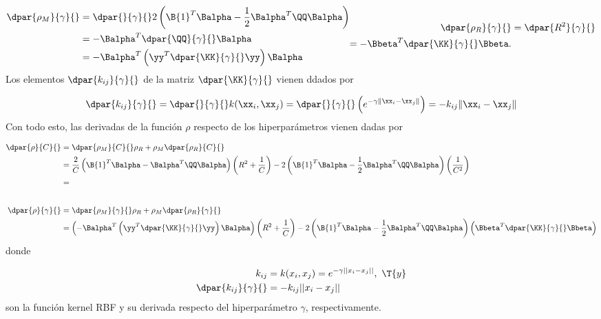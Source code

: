 \begin{align}
  \begin{aligned}
    \dpar{\rho_M}{\gamma}{}
    &= \dpar{}{\gamma}{} 2\left(  \B{1}^T\Balpha-\frac{1}{2}\Balpha^T\QQ\Balpha \right) \\
    &= - \Balpha^T \dpar{\QQ}{\gamma}{}\Balpha \\
    & = - \Balpha^T \left(\yy^T \dpar{\KK}{\gamma}{}\yy\right) \Balpha
  \end{aligned}
  \begin{aligned}
    \dpar{\rho_R}{\gamma}{} &= \dpar{R^2}{\gamma}{} \\
    = - \Bbeta^T \dpar{\KK}{\gamma}{} \Bbeta. %
  \end{aligned}
\end{align}
Los elementos $\dpar{k_{ij}}{\gamma}{}$ de la matriz $\dpar{\KK}{\gamma}{}$
vienen ddados por

\begin{align}
  \dpar{k_{ij}}{\gamma}{}
  = \dpar{}{\gamma}{}k(\xx_i,\xx_j)
  = \dpar{}{\gamma}{} \left(e^{-\gamma\|\xx_i-\xx_j\|}\right)
  = -k_{ij}\|\xx_i-\xx_j\|
\end{align}
Con todo esto, las derivadas de la función $\rho$ respecto de los
hiperparámetros vienen dadas por

\begin{align*}
    \dpar{\rho}{C}{} &= \dpar{\rho_M}{C}{} \rho_R + \rho_M \dpar{\rho_R}{C}{} \\
    &= \frac{2}{C} \left(\B{1}^T\Balpha - \Balpha^T\QQ\Balpha\right) \left( R^2 + \frac{1}{C} \right)
    - 2\left(  \B{1}^T\Balpha-\frac{1}{2}\Balpha^T\QQ\Balpha \right)
    \left( \frac{1}{C^2} \right)\\
    &=
  \\[2em]
    \dpar{\rho}{\gamma}{} &= \dpar{\rho_M}{\gamma}{} \rho_R + \rho_M \dpar{\rho_R}{\gamma}{}\\
    &= \left( - \Balpha^T \left(\yy^T \dpar{\KK}{\gamma}{}\yy\right) \Balpha \right)
    \left( R^2 + \frac{1}{C} \right)
    - 2\left(  \B{1}^T\Balpha-\frac{1}{2}\Balpha^T\QQ\Balpha \right)
    \left( \Bbeta^T \dpar{\KK}{\gamma}{} \Bbeta \right)
\end{align*}
donde

\begin{align}
  k_{ij}&=k(x_i,x_j)=e^{-\gamma||x_i-x_j||},\,\, \T{y} \\
  \dpar{k_{ij}}{\gamma}{}&=-k_{ij}||x_i-x_j||
\end{align}
son la función kernel RBF y su derivada respecto del hiperparámetro $\gamma$,
respectivamente.

